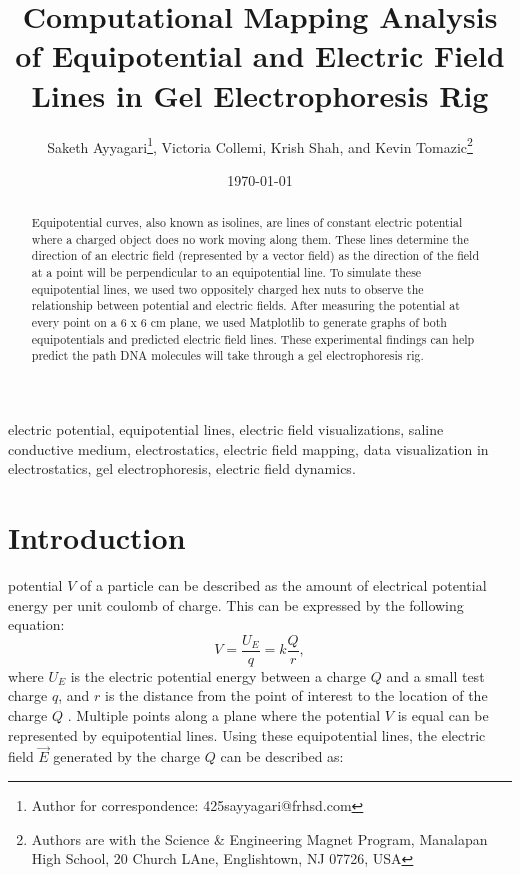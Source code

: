 \documentclass[10pt,journal,twoside]{IEEEtran}
\title{Computational Mapping Analysis of Equipotential and Electric Field Lines in Gel Electrophoresis Rig}
\author{Saketh Ayyagari\thanks{Author for correspondence: 425sayyagari@frhsd.com}, Victoria Collemi, Krish Shah, and Kevin Tomazic\thanks{Authors are with the Science \& Engineering Magnet Program, Manalapan High School, 20 Church LAne, Englishtown, NJ 07726, USA}}
\date{\today}
\begin{document}
\maketitle

\begin{abstract}
Equipotential curves, also known as isolines, are lines of constant electric potential where a charged object does no work moving along them. These lines determine the direction of an electric field (represented by a vector field) as the direction of the field at a point will be perpendicular to an equipotential line. To simulate these equipotential lines, we used two oppositely charged hex nuts to observe the relationship between potential and electric fields. After measuring the potential at every point on a 6 x 6 cm plane, we used Matplotlib to generate graphs of both equipotentials and predicted electric field lines. These experimental findings can help predict the path DNA molecules will take through a gel electrophoresis rig.
\end{abstract}

\begin{IEEEkeywords}
electric potential, equipotential lines, electric field visualizations, saline conductive medium, electrostatics, electric field mapping, data visualization in electrostatics, gel electrophoresis, electric field dynamics.
\end{IEEEkeywords}

\section{Introduction}
 potential $V$ of a particle can be described as the amount of electrical potential energy per unit coulomb of charge. This can be expressed by the following equation:
\begin{equation}
V = \frac{U_E}{q} = k \frac{Q}{r},
\label{eq:1}
\end{equation}
where $U_E$ is the electric potential energy between a charge $Q$ and a small test charge $q$, and $r$ is the distance from the point of interest to the location of the charge $Q$ \cite{tipler}. Multiple points along a plane where the potential $V$ is equal can be represented by equipotential lines. Using these equipotential lines, the electric field $\vec{E}$ generated by the charge $Q$ can be described as:
\end{document}
